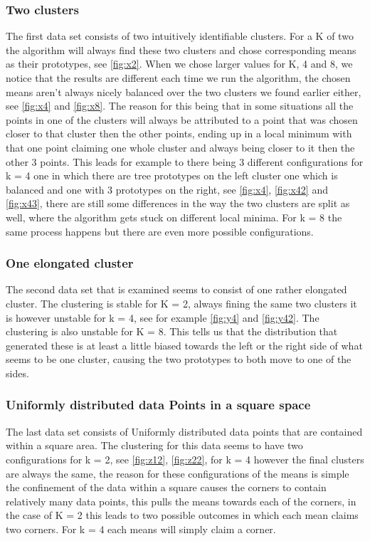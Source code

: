 \documentclass[10pt,a4paper]{article}
\begin{document}
\subsubsection{Two clusters	}
The first data set consists of two intuitively identifiable clusters. For a K of two the algorithm will always find these two clusters and chose corresponding means as their prototypes, see \autoref{fig:x2}. 
When we chose larger values for K, 4 and 8, we notice that the results are different each time we run the algorithm, the chosen means aren't always nicely balanced over the two clusters we found earlier either, see \autoref{fig:x4} and \autoref{fig:x8}. The reason for this being that in some situations all the points in one of the clusters will always be attributed to a point that was chosen  closer to that cluster then the other points, ending up in a local minimum with that one point claiming one whole cluster and always being closer to it then the other 3 points. 
This leads for example to there being 3 different configurations for k = 4 one in which there are tree prototypes on the left cluster one which is balanced and one with 3 prototypes on the right, see \autoref{fig:x4}, \autoref{fig:x42} and \autoref{fig:x43}, there are still some differences in the way the two clusters are split as well, where the algorithm gets stuck on different local minima. For k = 8 the same process happens but there are even more possible configurations.
\subsubsection{One elongated cluster}
The second data set that is examined seems to consist of one rather elongated cluster. The clustering is stable for K = 2, always fining the same two clusters it is however unstable for k = 4, see for example \autoref{fig:y4} and \autoref{fig:y42}. The clustering is also unstable for K = 8. This tells us that the distribution that generated these is at least a little biased towards the left or the right side of what seems to be one cluster, causing the two prototypes to both move to one of the sides.
\subsubsection{Uniformly distributed data Points in a square space}
The last data set consists of Uniformly distributed data points that are contained within a square area. The clustering for this data seems to have two configurations for k = 2, see \autoref{fig:z12}, \autoref{fig:z22}, for k = 4 however the final clusters are always the same, the reason for these configurations of the means is simple the confinement of the data within a square causes the corners to contain relatively many data points, this pulls the means towards each of the corners, in the case of K = 2 this leads to two possible outcomes in which each mean claims two corners. For k = 4 each means will simply claim a corner.
\end{document}
